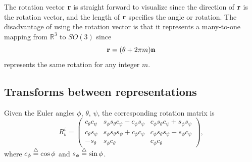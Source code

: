 The rotation vector $\mathbf{r}$ is straight forward to visualize since the direction of $\mathbf{r}$ is the rotation vector, and the length of $\mathbf{r}$ specifies the angle or rotation.
The disadvantage of using the rotation vector is that it represents a many-to-one mapping from $\mathbb{R}^3$ to $SO(3)$ since 
\[
\mathbf{r} = (\theta + 2\pi m)\mathbf{n}
\]
represents the same rotation for any integer $m$.  


\subsection{Transforms between representations}

\begin{lemma} \label{lem:euler_to_rotmat}
Given the Euler angles $\phi$, $\theta$, $\psi$, the corresponding rotation matrix is
\[
R_b^i = \begin{pmatrix}
	c_\theta c_\psi & s_\phi s_\theta c_\psi - c_\phi s_\psi & c_\phi s_\theta c_\psi + s_\phi s_\psi \\
	c_\theta s_\psi & s_\phi s_\theta s_\psi + c_\phi c_\psi & c_\phi s_\theta s_\psi - s_\phi c_\psi \\
	-s_\theta & s_\phi c_\theta & c_\phi c_\theta
    \end{pmatrix},
\]
where $c_\phi \stackrel{\triangle}{=} \cos\phi$ and $s_\phi \stackrel{\triangle}{=} \sin\phi$.
\end{lemma}

